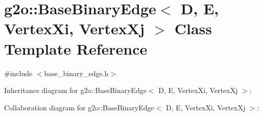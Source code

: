 \hypertarget{classg2o_1_1BaseBinaryEdge}{}\section{g2o\+:\+:Base\+Binary\+Edge$<$ D, E, Vertex\+Xi, Vertex\+Xj $>$ Class Template Reference}
\label{classg2o_1_1BaseBinaryEdge}


{\ttfamily \#include $<$base\+\_\+binary\+\_\+edge.\+h$>$}



Inheritance diagram for g2o\+:\+:Base\+Binary\+Edge$<$ D, E, Vertex\+Xi, Vertex\+Xj $>$\+:


Collaboration diagram for g2o\+:\+:Base\+Binary\+Edge$<$ D, E, Vertex\+Xi, Vertex\+Xj $>$\+:
